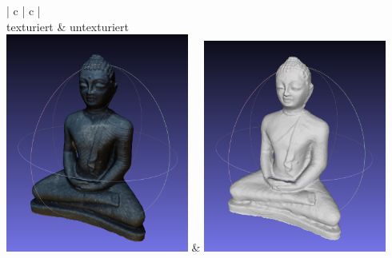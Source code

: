 \documentclass[]{article}
\begin{document}
\begin{table}[h]
	\begin{center}
		\begin{tabular}{| c | c |}
			\hline
			 \\
			\hline
			texturiert & untexturiert \\
			\hline
			\hline
			\includegraphics[width=0.45\textwidth]{./Images/Budha/Budha_SfM_Textured.png} & \includegraphics[width=0.45\textwidth]{./Images/Budha/Budha_SfM_Untextured.png} \\
			\hline

\end{tabular}
\end{center}
\end{table}
\end{document}
